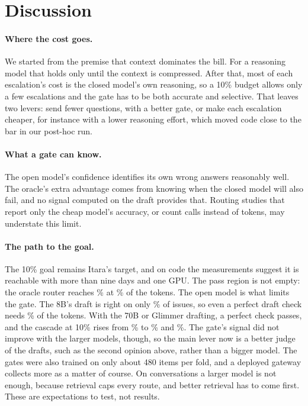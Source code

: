\documentclass[10pt,twocolumn]{article}
\begin{document}
\section{Discussion}
\label{sec:discussion}

\paragraph{Where the cost goes.} We started from the premise that context dominates the bill. For a reasoning model that holds only until the context is compressed. After that, most of each escalation's cost is the closed model's own reasoning, so a 10\% budget allows only a few escalations and the gate has to be both accurate and selective. That leaves two levers: send fewer questions, with a better gate, or make each escalation cheaper, for instance with a lower reasoning effort, which moved code close to the bar in our post-hoc run.

\paragraph{What a gate can know.} The open model's confidence identifies its own wrong answers reasonably well. The oracle's extra advantage comes from knowing when the closed model will also fail, and no signal computed on the draft provides that. Routing studies that report only the cheap model's accuracy, or count calls instead of tokens, may understate this limit.

\paragraph{The path to the goal.} The 10\% goal remains Itara's target, and on code the measurements suggest it is reachable with more than nine days and one GPU. The pass region is not empty: the oracle router reaches \accSweOracle\% at \shareSweOracle\% of the tokens. The open model is what limits the gate. The 8B's draft is right on only \draftRightSwe\% of issues, so even a perfect draft check needs \perfectShareSwe\% of the tokens. With the 70B or Glimmer drafting, a perfect check passes, and the cascade at 10\% rises from \cascadeSwe\% to \bigCascadeTen\% and \glimCascadeTen\%. The gate's signal did not improve with the larger models, though, so the main lever now is a better judge of the drafts, such as the second opinion above, rather than a bigger model. The gates were also trained on only about 480 items per fold, and a deployed gateway collects more as a matter of course. On conversations a larger model is not enough, because retrieval caps every route, and better retrieval has to come first. These are expectations to test, not results.
\end{document}
